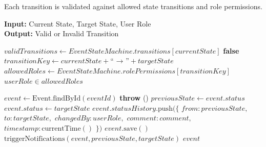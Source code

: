 Each transition is validated against allowed state transitions and role permissions.

\begin{algorithm}[H]
\caption{FSM Transition Validation}
\label{alg:fsm_validation}
\textbf{Input:} Current State, Target State, User Role\\
\textbf{Output:} Valid or Invalid Transition
\begin{algorithmic}[1]
    \State $validTransitions \gets EventStateMachine.transitions[currentState]$
        \State \Return \textbf{false}
    \EndIf
    \State $transitionKey \gets currentState + \text{`` → ''} + targetState$
    \State $allowedRoles \gets EventStateMachine.rolePermissions[transitionKey]$
    \State \Return $userRole \in allowedRoles$
\EndFunction

    \State $event \gets \text{Event.findById}(eventId)$
        \State \textbf{throw} ()
    \EndIf
    \State $previousState \gets event.status$
    \State $event.status \gets targetState$
    \State $event.statusHistory.\text{push}(\{$
    \State \hspace{1em} $from: previousState,$
    \State \hspace{1em} $to: targetState,$
    \State \hspace{1em} $changedBy: userRole,$
    \State \hspace{1em} $comment: comment,$
    \State \hspace{1em} $timestamp: \text{currentTime}()$
    \State $\})$
    \State $event.\text{save}()$
    \State $\text{triggerNotifications}(event, previousState, targetState)$
    \State \Return $event$
\EndFunction
\end{algorithmic}
\end{algorithm}

